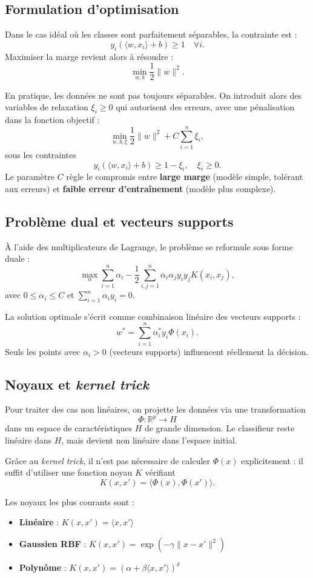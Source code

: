 \documentclass[11pt,a4paper]{article}
\begin{document}
\subsection{Formulation d’optimisation}
Dans le cas idéal où les classes sont parfaitement séparables, la contrainte est :
\[
y_i(\langle w, x_i \rangle + b) \ge 1 \quad \forall i.
\]
Maximiser la marge revient alors à résoudre :
\[
\min_{w,b} \frac{1}{2}\|w\|^2.
\]

En pratique, les données ne sont pas toujours séparables. On introduit alors des variables de relaxation $\xi_i \ge 0$ qui autorisent des erreurs, avec une pénalisation dans la fonction objectif :
\[
\min_{w,b,\xi} \frac{1}{2}\|w\|^2 + C \sum_{i=1}^n \xi_i,
\]
sous les contraintes
\[
y_i(\langle w, x_i \rangle + b) \ge 1 - \xi_i, \quad \xi_i \ge 0.
\]
Le paramètre $C$ règle le compromis entre \textbf{large marge} (modèle simple, tolérant aux erreurs) et \textbf{faible erreur d’entraînement} (modèle plus complexe).

\subsection{Problème dual et vecteurs supports}
À l’aide des multiplicateurs de Lagrange, le problème se reformule sous forme duale :
\[
\max_{\alpha} \sum_{i=1}^n \alpha_i - \frac{1}{2}\sum_{i,j=1}^n \alpha_i \alpha_j y_i y_j K(x_i, x_j),
\]
avec $0 \le \alpha_i \le C$ et $\sum_{i=1}^n \alpha_i y_i = 0$.

La solution optimale s’écrit comme combinaison linéaire des vecteurs supports :
\[
w^* = \sum_{i=1}^n \alpha_i^* y_i \Phi(x_i).
\]
Seuls les points avec $\alpha_i > 0$ (vecteurs supports) influencent réellement la décision.

\subsection{Noyaux et \textit{kernel trick}}
Pour traiter des cas non linéaires, on projette les données via une transformation
\[
\Phi : \mathbb{R}^p \to H
\]
dans un espace de caractéristiques $H$ de grande dimension.
Le classifieur reste linéaire dans $H$, mais devient non linéaire dans l’espace initial.

Grâce au \textit{kernel trick}, il n’est pas nécessaire de calculer $\Phi(x)$ explicitement :
il suffit d’utiliser une fonction noyau $K$ vérifiant
\[
K(x, x') = \langle \Phi(x), \Phi(x') \rangle.
\]

Les noyaux les plus courants sont :
\begin{itemize}
    \item \textbf{Linéaire} : $K(x,x') = \langle x, x' \rangle$
    \item \textbf{Gaussien RBF} : $K(x,x') = \exp(-\gamma \|x - x'\|^2)$
    \item \textbf{Polynôme} : $K(x,x') = (\alpha + \beta \langle x, x' \rangle)^\delta$
\end{itemize}
\end{document}
